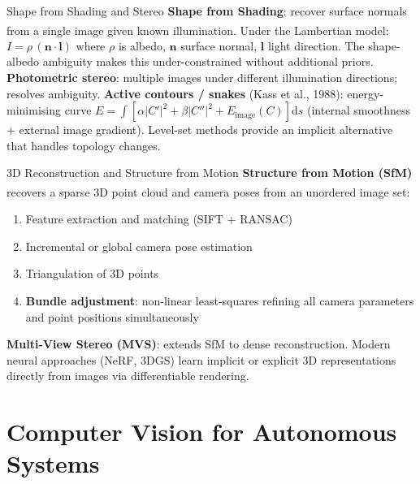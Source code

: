 \begin{v3topic}{Shape from Shading and Stereo}
    \textbf{Shape from Shading}: recover surface normals from a single image given known illumination\textsuperscript{\cite[][pp.~667--676]{szeliski2022}}.
    Under the Lambertian model: $I = \rho\,(\mathbf{n} \cdot \mathbf{l})$
    where $\rho$ is albedo, $\mathbf{n}$ surface normal, $\mathbf{l}$ light direction.
    The shape-albedo ambiguity makes this under-constrained without additional priors.
    \textbf{Photometric stereo}: multiple images under different illumination directions; resolves ambiguity.
\visualseparator
    \textbf{Active contours / snakes} (Kass et al., 1988): energy-minimising curve
    $E = \int \left[\alpha|C'|^2 + \beta|C''|^2 + E_{\mathrm{image}}(C)\right] \mathrm{d}s$
    (internal smoothness + external image gradient). Level-set methods provide an implicit alternative that handles topology changes.

\end{v3topic}
\begin{v3topic}{3D Reconstruction and Structure from Motion}
    \textbf{Structure from Motion (SfM)} recovers a sparse 3D point cloud and camera poses from an unordered image set\textsuperscript{\cite[][pp.~719--733]{szeliski2022}}:
    \begin{enumerate}
        \item Feature extraction and matching (SIFT + RANSAC)
        \item Incremental or global camera pose estimation
        \item Triangulation of 3D points
        \item \textbf{Bundle adjustment}: non-linear least-squares refining all camera parameters and point positions simultaneously
    \end{enumerate}
    \textbf{Multi-View Stereo (MVS)}: extends SfM to dense reconstruction.
    Modern neural approaches (NeRF, 3DGS) learn implicit or explicit 3D representations directly from images via differentiable rendering.
\end{v3topic}


\section{Computer Vision for Autonomous Systems}

